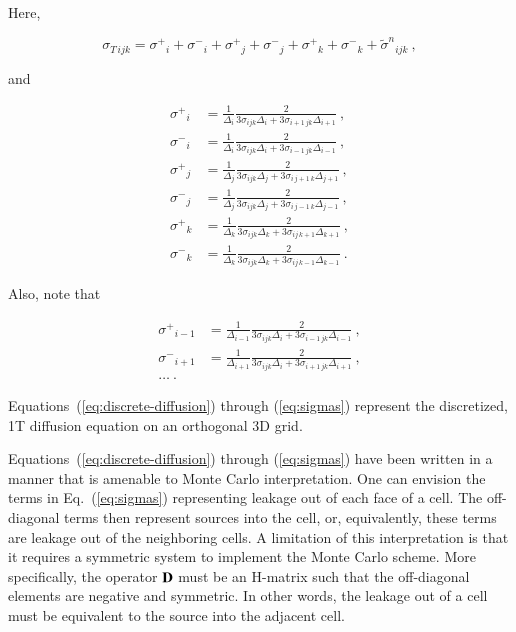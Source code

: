 \documentclass[preprint,12pt]{elsarticle}
\newcommand{\sign}{\ensuremath{\tilde{\sigma}^n}}
\newcommand{\Di}{\ensuremath{\Delta_i}}
\newcommand{\Dj}{\ensuremath{\Delta_j}}
\newcommand{\Dk}{\ensuremath{\Delta_k}}
\newcommand{\sigT}{\ensuremath{\sigma_{T\,ijk}}}
\newcommand{\sigm}{\ensuremath{\sigma^{-}}}
\newcommand{\sigp}{\ensuremath{\sigma^{+}}}
\begin{document}
Here,

\begin{equation}
  \sigT = \sigp_i + \sigm_i + \sigp_j + \sigm_j + \sigp_k + \sigm_k
  + \sign_{ijk}\:,
\end{equation}

and

\begin{subequations}
  \begin{align}
    \sigp_{i} &= \frac{1}{\Di}\frac{2}{3\sigma_{ijk}\Di
      + 3\sigma_{i+1\,jk}\Delta_{i+1}}\:,\\
    \sigm_{i} &= \frac{1}{\Di}\frac{2}{3\sigma_{ijk}\Di
      + 3\sigma_{i-1\,jk}\Delta_{i-1}}\:,\\
    \sigp_{j} &= \frac{1}{\Dj}\frac{2}{3\sigma_{ijk}\Dj
      + 3\sigma_{i\,j+1\,k}\Delta_{j+1}}\:,\\
    \sigm_{j} &= \frac{1}{\Dj}\frac{2}{3\sigma_{ijk}\Dj
      + 3\sigma_{i\,j-1\,k}\Delta_{j-1}}\:,\\
    \sigp_{k} &= \frac{1}{\Dk}\frac{2}{3\sigma_{ijk}\Dk
      + 3\sigma_{ij\,k+1}\Delta_{k+1}}\:,\\
    \sigm_{k} &= \frac{1}{\Dk}\frac{2}{3\sigma_{ijk}\Dk
      + 3\sigma_{ij\,k-1}\Delta_{k-1}}\:. 
  \end{align}
  \label{eq:sigmas}
\end{subequations}

Also, note that

\begin{align*}
  \sigp_{i-1} &= \frac{1}{\Delta_{i-1}}\frac{2}{3\sigma_{ijk}\Di
    + 3\sigma_{i-1\,jk}\Delta_{i-1}}\:,\\
  \sigm_{i+1} &= \frac{1}{\Delta_{i+1}}\frac{2}{3\sigma_{ijk}\Di
    + 3\sigma_{i+1\,jk}\Delta_{i+1}}\:,\\
  \ldots\:.
\end{align*}

Equations~(\ref{eq:discrete-diffusion}) through (\ref{eq:sigmas})
represent the discretized, 1T diffusion equation on an orthogonal
3D grid. 

Equations~(\ref{eq:discrete-diffusion}) through (\ref{eq:sigmas}) have
been written in a manner that is amenable to Monte Carlo
interpretation.  One can envision the terms in Eq.~(\ref{eq:sigmas})
representing leakage out of each face of a cell.  The off-diagonal
terms then represent sources into the cell, or, equivalently, these
terms are leakage out of the neighboring cells.  A limitation of this
interpretation is that it requires a symmetric system to implement the
Monte Carlo scheme.  More specifically, the operator $\mathbf{D}$ must be
an H-matrix \cite{kelley_1995} such that the off-diagonal elements are
negative and symmetric.  In other words, the leakage out of a cell
must be equivalent to the source into the adjacent cell.
\end{document}
